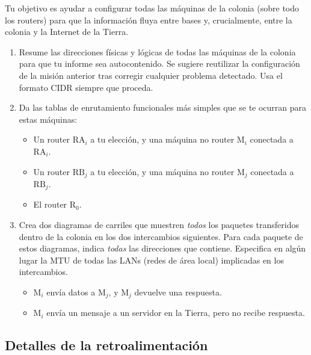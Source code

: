 \noindent
Tu objetivo es ayudar a configurar todas las máquinas de la colonia (sobre todo los routers) para que la información fluya entre bases y, crucialmente, entre la colonia y la Internet de la Tierra.
\vspace{-0.2cm}

\begin{enumerate}[itemsep=0.1cm]
\item Resume las direcciones físicas y lógicas de todas las máquinas de la colonia para que tu informe sea autocontenido. Se sugiere reutilizar la configuración de la misión anterior tras corregir cualquier problema detectado. Usa el formato CIDR siempre que proceda.

\item Da las tablas de enrutamiento funcionales más simples que se te ocurran para estas máquinas:
\begin{itemize}
\item Un router $\textrm{RA}_i$ a tu elección,
y una máquina no router $\textrm{M}_i$ conectada a $\textrm{RA}_i$.
\item Un router $\textrm{RB}_j$ a tu elección,
y una máquina no router $\textrm{M}_j$ conectada a $\textrm{RB}_j$.
\item El router $\textrm{R}_0$.
\end{itemize}

\item Crea dos diagramas de carriles que muestren \textit{todos} los paquetes transferidos dentro de la colonia en los dos intercambios siguientes. Para cada paquete de estos diagramas, indica \textit{todas} las direcciones que contiene. Especifica en algún lugar la MTU de todas las LANs (redes de área local) implicadas en los intercambios.
\begin{itemize}
\item $\textrm{M}_i$ envía datos a $\textrm{M}_j$, y $\textrm{M}_j$ devuelve una respuesta.
\item $\textrm{M}_i$ envía un mensaje a un servidor en la Tierra, pero no recibe respuesta.
\end{itemize}
\end{enumerate}

\subsection*{Detalles de la retroalimentación}

